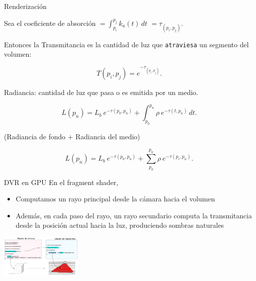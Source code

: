 \documentclass[spanish]{beamer}
\begin{document}
\begin{frame}{Renderización}


Sea el coeficiente de absorción $ = \int_{p_i}^{p_j} k_a(t) \, dt$  $ = \tau_{(p_i, p_j)}$.


Entonces la Transmitancia es la cantidad de luz que \texttt{atraviesa} un segmento del volumen:

\begin{equation*}
  T(p_i,p_j) = e^{-\tau_{(p_i, p_j)}}.
\end{equation*}

Radiancia: cantidad de luz que pasa o es emitida por un medio.

\begin{equation*}
  L(p_n) = L_b \ e^{-\tau(p_0, p_n)} + \int_{p_0}^{p_n} \rho \ e^{-\tau(t,p_n)} \, dt.
\end{equation*}

(Radiancia de fondo $+$ Radiancia del medio)


\begin{equation*}
  L(p_n) = L_b \ e^{-\tau(p_0, p_n)} + \sum_{p_0}^{p_n} \rho \ e^{-\tau(p_i,p_n)}.
\end{equation*}


\end{frame}


\begin{frame}{DVR en GPU}
\centering
En el fragment shader,
\begin{itemize}
\item Computamos un rayo principal desde la cámara hacia el volumen
\item Además, en cada paso del rayo, un rayo secundario computa la transmitancia desde la posición actual hacia la luz, produciendo sombras naturales
\end{itemize}


\centerline{\includegraphics[width=4cm]{../figures/fragmentshader}}


\end{frame}
\end{document}

